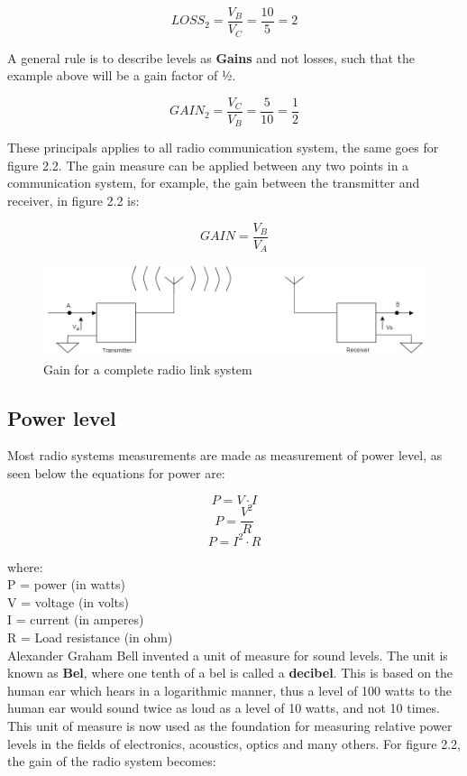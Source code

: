 $$LOSS_2 = \frac{V_B}{V_C} = \frac{10}{5} = 2$$

A general rule is to describe levels as \textbf{Gains} and not losses, such that the example above will be a gain factor of ½.

$$GAIN_2 = \frac{V_C}{V_B} = \frac{5}{10} = \frac{1}{2}$$

These principals applies to all radio communication system, the same goes for figure 2.2. The gain measure can be applied between any two points in a communication system, for example, the gain between the transmitter and receiver, in figure 2.2 is:

$$GAIN = \frac{V_B}{V_A}$$

\begin{figure}[h]
\centering
\includegraphics[scale=0.55]{figures/RadioCom.PNG}
\caption{Gain for a complete radio link system}
\end{figure}

\subsection{Power level}

Most radio systems measurements are made as measurement of power level, as seen below the equations for power are:

\begin{equation}
    P = V \cdot I
\end{equation}
\begin{equation}
    P = \frac{V^2}{R}
\end{equation}
\begin{equation}
    P = I^2 \cdot R
\end{equation}

where:\\

P = power (in watts)\\
V = voltage (in volts)\\
I = current (in amperes)\\
R = Load resistance (in ohm)\\

Alexander Graham Bell invented a unit of measure for sound levels. The unit is known as \textbf{Bel}, where one tenth of a bel is called a \textbf{decibel}. This is based on the human ear which hears in a logarithmic manner, thus a level of 100 watts to the human ear would sound twice as loud as a level of 10 watts, and not 10 times. This unit of measure is now used as the foundation for measuring relative power levels in the fields of electronics, acoustics, optics and many others. For figure 2.2, the gain of the radio system becomes: 

